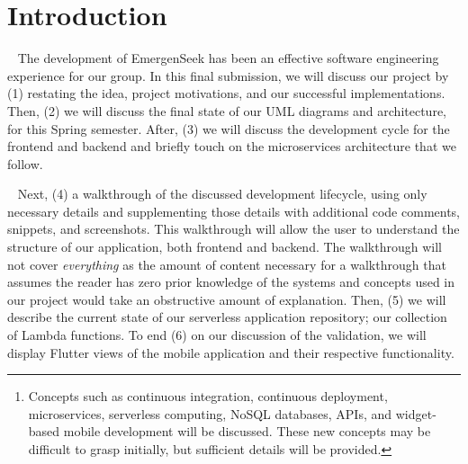 \documentclass[10pt, a4paper]{article}
\begin{document}
\vspace*{\fill}
\vspace{-2cm}
\begin{abstract}
In this final report, we describe and detail the validation of EmergenSeek, a multiuse, cross-platform mobile application providing simple access to emergency services and contact connections. As with previous reports, we will structure the report by enumerating on the frontend and backend. Dissimilarly, we will only describe necessary details in the validation of our implementations, to the extent that, any other developer with some programming background will be able to successfully implement our system's components. Only necessary details will be presented to the reader and care should be taken when reading them\footnote{Concepts such as continuous integration, continuous deployment, microservices, serverless computing, NoSQL databases, APIs, and widget-based mobile development will be discussed. These new concepts may be difficult to grasp initially, but sufficient details will be provided.}. Restatements from previous deliverable reports will be made to remind the reader of pre-defined, but important information. Also, a glossary is provided at the end of the report to define terms and jargon that may be confusing or unfamiliar for the reader. \\
\textit{Keywords:} API Gateway, CI/CD, Cloud, Dart, Flutter, Golang, Lambda, Mobile, Serverless
\end{abstract}
\vspace*{\fill}
\newpage

\tableofcontents
\newpage


\section{Introduction}
\par ~ The development of EmergenSeek has been an effective software engineering experience for our group. In this final submission, we will discuss our project by (1) restating the idea, project motivations, and our successful implementations. Then, (2) we will discuss the final state of our UML diagrams and architecture, for this Spring semester. After, (3) we will discuss the development cycle for the frontend and backend and briefly touch on the microservices architecture that we follow. 

\par ~ Next, (4) a walkthrough of the discussed development lifecycle, using only necessary details and supplementing those details with additional code comments, snippets, and screenshots. This walkthrough will allow the user to understand the structure of our application, both frontend and backend. The walkthrough will not cover \emph{everything} as the amount of content necessary for a walkthrough that assumes the reader has zero prior knowledge of the systems and concepts used in our project would take an obstructive amount of explanation. Then, (5) we will describe the current state of our serverless application repository; our collection of Lambda functions. To end (6) on our discussion of the validation, we will display Flutter views of the mobile application and their respective functionality. 
\end{document}
